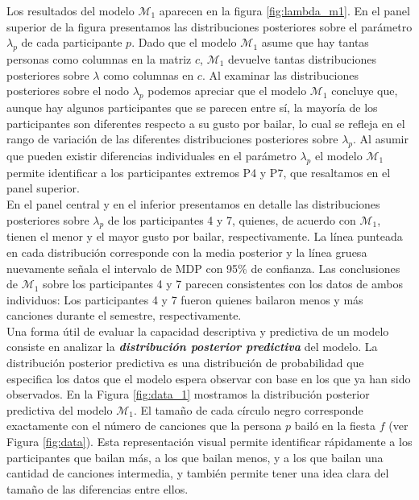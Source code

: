 \documentclass{article}
\begin{document}
\indent Los resultados del modelo $\mathcal M_1$ aparecen en la figura \ref{fig:lambda_m1}. En el panel superior de la figura presentamos las distribuciones posteriores sobre el parámetro $\lambda_p$ de cada participante $p$. Dado que el modelo $\mathcal M_1$ asume que hay tantas personas como columnas en la matriz $c$, $\mathcal M_1$ devuelve tantas distribuciones posteriores sobre $\lambda$ como columnas en $c$. Al examinar las distribuciones posteriores sobre el nodo $\lambda_p$ podemos apreciar que el modelo $\mathcal M_1$ concluye que, aunque hay algunos participantes que se parecen entre sí, la mayoría de los participantes son diferentes respecto a su gusto por bailar, lo cual se refleja en el rango de variación de las diferentes distribuciones posteriores sobre $\lambda_p$. Al asumir que pueden existir diferencias individuales en el parámetro $\lambda_p$ el modelo $\mathcal M_1$ permite identificar a los participantes extremos P4 y P7, que resaltamos en el panel superior.\\
\indent En el panel central y en el inferior presentamos en detalle las distribuciones posteriores sobre $\lambda_p$ de los participantes 4 y 7, quienes, de acuerdo con $\mathcal M_1$, tienen el menor y el mayor gusto por bailar, respectivamente. La línea punteada en cada distribución corresponde con la media posterior y la línea gruesa nuevamente señala el intervalo de MDP con 95\% de confianza. Las conclusiones de $\mathcal M_1$ sobre los participantes 4 y 7 parecen consistentes con los datos de ambos individuos: Los participantes 4 y 7 fueron quienes bailaron menos y más canciones durante el semestre, respectivamente.\\
\indent Una forma útil de evaluar la capacidad descriptiva y predictiva de un modelo consiste en analizar la \emph{\textbf{distribución posterior predictiva}} del modelo. La distribución posterior predictiva es una distribución de probabilidad que especifica los datos que el modelo espera observar con base en los que ya han sido observados. En la Figura \ref{fig:data_1} mostramos la distribución posterior predictiva del modelo $\mathcal M_1$. El tamaño de cada círculo negro corresponde exactamente con el número de canciones que la persona $p$ bailó en la fiesta $f$ (ver Figura \ref{fig:data}). Esta representación visual permite identificar rápidamente a los participantes que bailan más, a los que bailan menos, y a los que bailan una cantidad de canciones intermedia, y también permite tener una idea clara del tamaño de las diferencias entre ellos.
\end{document}
